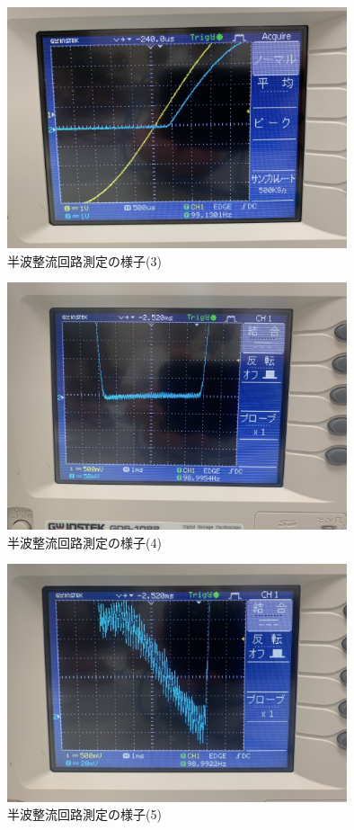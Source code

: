 \documentclass[titlepage]{jarticle}
\begin{document}
\begin{figure}[H]
    \begin{center}
        \includegraphics[width=10cm]{image/diode/S__19873811.jpg}
        \caption{半波整流回路測定の様子(3)}
        \label{fig:半波整流回路測定の様子(3)}
    \end{center}
\end{figure}

\begin{figure}[H]
    \begin{center}
        \includegraphics[width=10cm]{image/diode/S__19873802.jpg}
        \caption{半波整流回路測定の様子(4)}
        \label{fig:半波整流回路測定の様子(4)}
    \end{center}
\end{figure}

\begin{figure}[H]
    \begin{center}
        \includegraphics[width=10cm]{image/diode/S__19873801.jpg}
        \caption{半波整流回路測定の様子(5)}
        \label{fig:半波整流回路測定の様子(5)}
    \end{center}
\end{figure}
\end{document}
